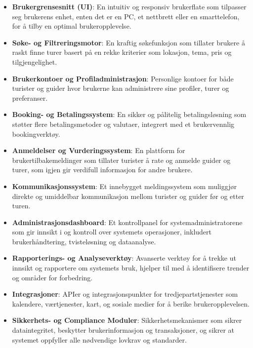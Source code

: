 \documentclass[../doc.tex]{subfiles}
\begin{document}
\begin{itemize}
    \item \textbf{Brukergrensesnitt (UI)}: En intuitiv og responsiv brukerflate som tilpasser seg brukerens enhet, enten det er en PC, et nettbrett eller en smarttelefon, for å tilby en optimal brukeropplevelse.

    \item \textbf{Søke- og Filtreringsmotor}: En kraftig søkefunksjon som tillater brukere å raskt finne turer basert på en rekke kriterier som lokasjon, tema, pris og tilgjengelighet.

    \item \textbf{Brukerkontoer og Profiladministrasjon}: Personlige kontoer for både turister og guider hvor brukerne kan administrere sine profiler, turer og preferanser.

    \item \textbf{Booking- og Betalingssystem}: En sikker og pålitelig betalingsløsning som støtter flere betalingsmetoder og valutaer, integrert med et brukervennlig bookingverktøy.

    \item \textbf{Anmeldelser og Vurderingssystem}: En plattform for brukertilbakemeldinger som tillater turister å rate og anmelde guider og turer, som igjen gir verdifull informasjon for andre brukere.

    \item \textbf{Kommunikasjonssystem}: Et innebygget meldingssystem som muliggjør direkte og umiddelbar kommunikasjon mellom turister og guider før og etter turen.

    \item \textbf{Administrasjonsdashboard}: Et kontrollpanel for systemadministratorene som gir innsikt i og kontroll over systemets operasjoner, inkludert brukerhåndtering, tvisteløsning og dataanalyse.

    \item \textbf{Rapporterings- og Analyseverktøy}: Avanserte verktøy for å trekke ut innsikt og rapportere om systemets bruk, hjelper til med å identifisere trender og områder for forbedring.

    \item \textbf{Integrasjoner}: APIer og integrasjonspunkter for tredjepartstjenester som kalendere, værtjenester, kart, og sosiale medier for å berike brukeropplevelsen.

    \item \textbf{Sikkerhets- og Compliance Moduler}: Sikkerhetsmekanismer som sikrer dataintegritet, beskytter brukerinformasjon og transaksjoner, og sikrer at systemet oppfyller alle nødvendige lovkrav og standarder.
\end{itemize}
\end{document}
